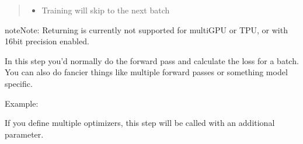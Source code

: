 \documentclass[letterpaper,10pt,english]{sphinxmanual}
\begin{document}
\begin{fulllineitems}
\begin{fulllineitems}
\begin{quote}
\begin{description}
\begin{itemize}
\item {} 
\sphinxAtStartPar
{} \sphinxhyphen{} Training will skip to the next batch

\end{itemize}


\end{description}\end{quote}

\begin{sphinxadmonition}{note}{Note:}
\sphinxAtStartPar
Returning  is currently not supported for multi\sphinxhyphen{}GPU or TPU, or with 16\sphinxhyphen{}bit precision enabled.
\end{sphinxadmonition}

\sphinxAtStartPar
In this step you’d normally do the forward pass and calculate the loss for a batch.
You can also do fancier things like multiple forward passes or something model specific.

\sphinxAtStartPar
Example:

\begin{sphinxVerbatim}[commandchars=\\\{\}]
   
        
      
       
     
\end{sphinxVerbatim}

\sphinxAtStartPar
If you define multiple optimizers, this step will be called with an additional
 parameter.

\begin{sphinxVerbatim}[commandchars=\\\{\}]
    
       
       
\end{sphinxVerbatim}


\end{fulllineitems}
\end{fulllineitems}
\end{document}
